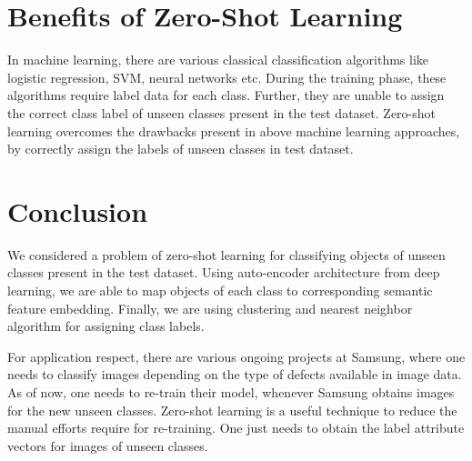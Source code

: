 \documentclass[11pt, conference, english]{IEEEtran}
\theoremstyle{plain}
\theoremstyle{definition}
\theoremstyle{remark}
\begin{document}
	\section{Benefits of Zero-Shot Learning}
In machine learning, there are various classical classification algorithms like logistic regression, SVM, neural networks etc. During the training phase, these algorithms require label data for each class. Further, they are unable to assign the correct class label of unseen classes present in the test dataset.
Zero-shot learning overcomes the drawbacks present in above machine learning approaches, by correctly assign the labels of unseen classes in test dataset.
	\section{Conclusion}
	We considered a problem of zero-shot learning for classifying objects of unseen classes present in the test dataset. Using auto-encoder architecture from deep learning, we are able to map objects of each class to corresponding semantic feature embedding. Finally, we are using clustering and nearest neighbor algorithm for assigning class labels.
	
	For application respect, there are various ongoing projects at Samsung, where one needs to classify images depending on the type of defects available in image data. As of now, one needs to re-train their model, whenever Samsung obtains images for the new unseen classes. Zero-shot learning is a useful technique to reduce the manual efforts require for re-training. One just needs to obtain the label attribute vectors for images of unseen classes. 
	
	
	
	
	
	
	

\onecolumn
\end{document}
